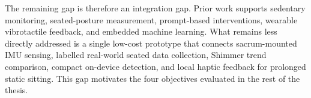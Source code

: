 The remaining gap is therefore an integration gap. Prior work supports sedentary monitoring, seated-posture measurement, prompt-based interventions, wearable vibrotactile feedback, and embedded machine learning. What remains less directly addressed is a single low-cost prototype that connects sacrum-mounted IMU sensing, labelled real-world seated data collection, Shimmer trend comparison, compact on-device detection, and local haptic feedback for prolonged static sitting. This gap motivates the four objectives evaluated in the rest of the thesis.

\FloatBarrier
